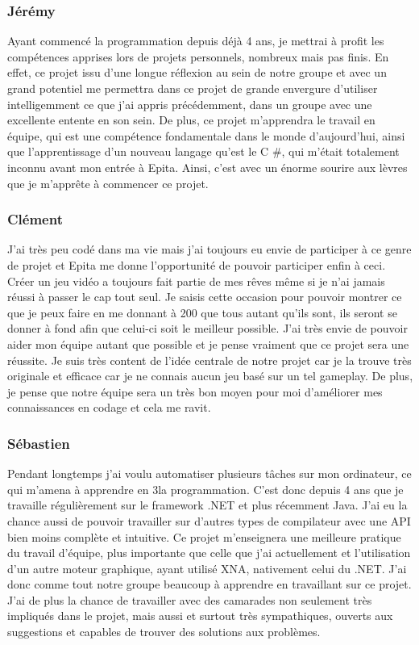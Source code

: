 ﻿\documentclass[12pt]{article}
\begin{document}
\subsubsection{Jérémy }
Ayant commencé la programmation depuis déjà 4 ans, je mettrai à profit les compétences
apprises lors de projets personnels, nombreux mais pas finis. En effet, ce projet issu
d'une longue réflexion au sein de notre groupe et avec un grand potentiel me permettra
dans ce projet de grande envergure d'utiliser intelligemment ce que j'ai appris précédemment,
dans un groupe avec une excellente entente en son sein. De plus, ce projet m'apprendra
le travail en équipe, qui est une compétence fondamentale dans le monde d'aujourd'hui,
ainsi que l'apprentissage d'un nouveau langage qu'est le C #, qui m'était totalement
inconnu avant mon entrée à Epita. Ainsi, c'est avec un énorme sourire aux lèvres que
je m'apprête à commencer ce projet. 

\subsubsection{Clément }
J'ai très peu codé dans ma vie mais j'ai toujours eu envie de participer à ce genre de
projet et Epita me donne l'opportunité de pouvoir participer enfin à ceci. Créer un jeu
vidéo a toujours fait partie de mes rêves même si je n'ai jamais réussi à passer le cap
tout seul. Je saisis cette occasion pour pouvoir montrer ce que je peux faire en me
donnant à 200%
que tous autant qu'ils sont, ils seront se donner à fond afin que celui-ci soit le
meilleur possible. J'ai très envie de pouvoir aider mon équipe autant que possible et
je pense vraiment que ce projet sera une réussite. Je suis très content de l'idée
centrale de notre projet car je la trouve très originale et efficace car je ne connais
aucun jeu basé sur un tel gameplay. De plus, je pense que notre équipe sera un très 
bon moyen pour moi d'améliorer mes connaissances en codage et cela me ravit. 

\subsubsection{Sébastien }
Pendant longtemps j'ai voulu automatiser plusieurs tâches sur mon ordinateur, ce qui
m'amena à apprendre en 3\ieme la programmation. C'est donc depuis 4 ans que je travaille
régulièrement sur le framework .NET et plus récemment Java. J'ai eu la chance aussi de
pouvoir travailler sur d'autres types de compilateur avec une API bien moins complète
et intuitive. Ce projet m'enseignera une meilleure pratique du travail d'équipe, plus
importante que celle que j'ai actuellement et l'utilisation d'un autre moteur graphique,
ayant utilisé XNA, nativement celui du .NET. J'ai donc comme tout notre groupe beaucoup
à apprendre en travaillant sur ce projet. J'ai de plus la chance de travailler avec des
camarades non seulement très impliqués dans le projet, mais aussi et surtout très sympathiques,
ouverts aux suggestions et capables de trouver des solutions aux problèmes.
\end{document}
